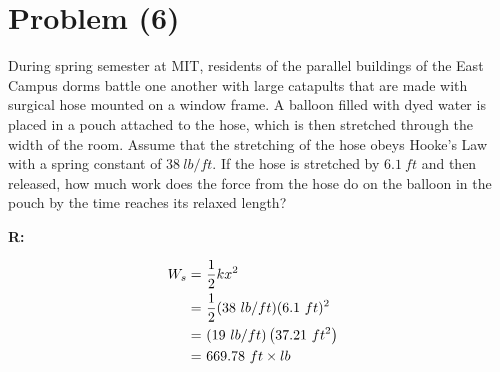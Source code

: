 \section{Problem (6)}
	During spring semester at MIT, residents of the parallel buildings of the East Campus dorms battle one another with large catapults that are made with surgical hose mounted on a window frame. A balloon filled with dyed water is placed in a pouch attached to the hose, which is then stretched through the width of the room. Assume that the stretching of the hose obeys Hooke's Law with a spring constant of $38 \ lb/ft$. If the hose is stretched by $6.1 \ ft$ and then released, how much work does the force from the hose do on the balloon in the pouch by the time reaches its relaxed length?

	\textbf{R:}

	\begin{align}
		W_{s} = \ &\frac{1}{2}kx^{2}& \notag \\
		= \ &\frac{1}{2}(38 \ lb/ft)(6.1 \ ft)^{2}& \notag \\
		= \ &(19 \ lb/ft)\left(37.21 \ ft^{2}\right)& \notag \\
		= \ &669.78 \ ft \times lb&
	\end{align}
